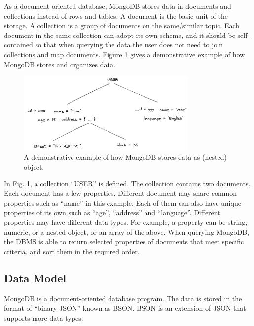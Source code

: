 As a document-oriented database, MongoDB stores data in documents and collections instead of rows and tables. A document is the basic unit of the storage. A collection is a group of documents on the same/similar topic. Each document in the same collection can adopt its own schema, and it should be self-contained so that when querying the data the user does not need to join collections and map documents. Figure \ref{ch:database:mongotree} gives a demonstrative example of how MongoDB stores and organizes data.
\begin{figure}[htbp]
	\centering
	\includegraphics[width=250pt]{chapters/part-3/figures/mongodb_tree.png}
	\caption{A demonstrative example of how MongoDB stores data as (nested) object.} \label{ch:database:mongotree}
\end{figure}

In Fig. \ref{ch:database:mongotree}, a collection ``USER'' is defined. The collection contains two documents. Each document has a few properties. Different document may share common properties such as ``name'' in this example. Each of them can also have unique properties of its own such as ``age'', ``address'' and ``language''. Different properties may have different data types. For example, a property can be string, numeric, or a nested object, or an array of the above. When querying MongoDB, the DBMS is able to return selected properties of documents that meet specific criteria, and sort them in the required order.

\subsection{Data Model}

MongoDB is a document-oriented database program. The data is stored in the format of ``binary JSON'' known as BSON. BSON is an extension of JSON that supports more data types.

